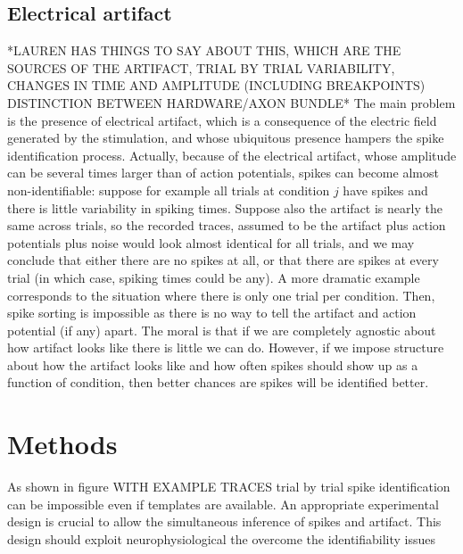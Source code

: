 \documentclass[12pt,letterpaper,fleqn]{article}
\begin{document}
\subsection{Electrical artifact}
*LAUREN HAS THINGS TO SAY ABOUT THIS, WHICH ARE THE SOURCES OF THE ARTIFACT, TRIAL BY TRIAL VARIABILITY,  CHANGES IN TIME AND AMPLITUDE (INCLUDING BREAKPOINTS) DISTINCTION BETWEEN HARDWARE/AXON BUNDLE*
 The main problem is the presence of electrical artifact, which is a consequence of the electric field generated by the stimulation, and whose ubiquitous presence hampers the spike identification process. Actually, because of the electrical artifact, whose amplitude can be several times larger than of action potentials, spikes can become almost non-identifiable: suppose for example all trials at condition $j$ have spikes and there is little variability in spiking times. Suppose also the artifact is nearly the same across trials, so the recorded traces, assumed to be the artifact plus action potentials plus noise would look almost identical for all trials, and we may conclude that either there are no spikes at all, or that there are spikes at every trial (in which case, spiking times could be any). A more dramatic example corresponds to the situation where there is only one trial per condition. Then, spike sorting is impossible as there is no way to tell the artifact and action potential (if any) apart. The moral is that if we are completely agnostic about how artifact looks like there is little we can do. However, if we impose structure about how the artifact looks like and how often spikes should show up as a function of condition, then better chances are spikes will be identified better.   
\section{Methods}

As shown in figure WITH EXAMPLE TRACES trial by trial spike identification can be impossible even if templates are available. An appropriate experimental design is crucial to allow the simultaneous inference of spikes and artifact. This design should exploit neurophysiological the overcome the identifiability issues
\end{document}

